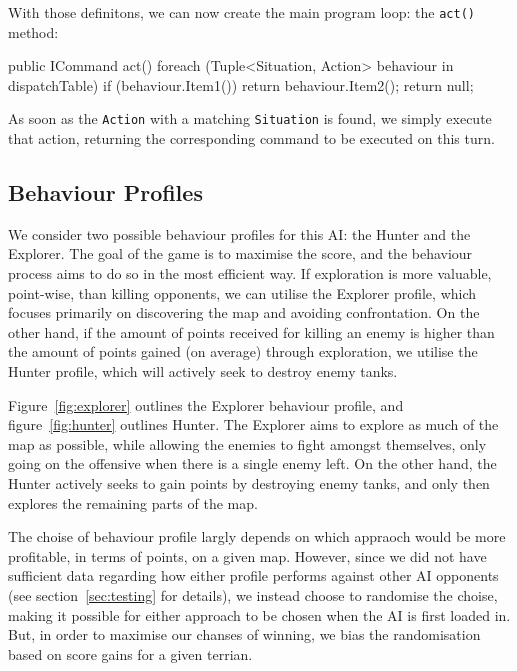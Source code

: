 \documentclass[11pt]{article}
\begin{document}
With those definitons, we can now create the main program loop: the \verb|act()| method:

\begin{code}
public ICommand act()
{
  foreach (Tuple<Situation, Action> behaviour in dispatchTable)
  {
    if (behaviour.Item1())
    {
      return behaviour.Item2();
    }
  }
  return null;
}
\end{code}

As soon as the \verb|Action| with a matching \verb|Situation| is found, we simply execute that action, returning the corresponding command to be executed on this turn.

\subsection{Behaviour Profiles} \label{sec:behaviourProfiles}

We consider two possible behaviour profiles for this AI: the Hunter and the Explorer. The goal of the game is to maximise the score, and the behaviour process aims to do so in the most efficient way. If exploration is more valuable, point-wise, than killing opponents, we can utilise the Explorer profile, which focuses primarily on discovering the map and avoiding confrontation. On the other hand, if the amount of points received for killing an enemy is higher than the amount of points gained (on average) through exploration, we utilise the Hunter profile, which will actively seek to destroy enemy tanks.

Figure~\ref{fig:explorer} outlines the Explorer behaviour profile, and figure~\ref{fig:hunter} outlines Hunter. The Explorer aims to explore as much of the map as possible, while allowing the enemies to fight amongst themselves, only going on the offensive when there is a single enemy left. On the other hand, the Hunter actively seeks to gain points by destroying enemy tanks, and only then explores the remaining parts of the map.

The choise of behaviour profile largly depends on which appraoch would be more profitable, in terms of points, on a given map. However, since we did not have sufficient data regarding how either profile performs against other AI opponents (see section~\ref{sec:testing} for details), we instead choose to randomise the choise, making it possible for either approach to be chosen when the AI is first loaded in. But, in order to maximise our chanses of winning, we bias the randomisation based on score gains for a given terrian.
\end{document}
